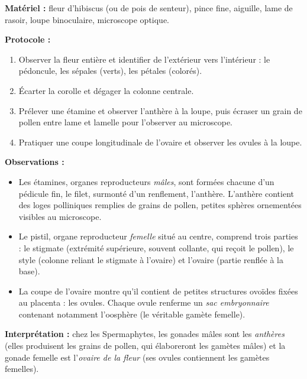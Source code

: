 \documentclass[11pt]{article}
\newcommand{\cle}[1]{{\popxbold\color{popdark}#1}}
\begin{document}
\begin{experience}
\textbf{Matériel :} fleur d'hibiscus (ou de pois de senteur), pince fine, aiguille, lame de rasoir, loupe binoculaire, microscope optique.

\textbf{Protocole :}
\begin{enumerate}
\item Observer la fleur entière et identifier de l'extérieur vers l'intérieur : le pédoncule, les sépales (verts), les pétales (colorés).
\item Écarter la corolle et dégager la colonne centrale.
\item Prélever une étamine et observer l'anthère à la loupe, puis écraser un grain de pollen entre lame et lamelle pour l'observer au microscope.
\item Pratiquer une coupe longitudinale de l'ovaire et observer les ovules à la loupe.
\end{enumerate}

\textbf{Observations :}
\begin{itemize}
\item Les \cle{étamines}, organes reproducteurs \emph{mâles}, sont formées chacune d'un pédicule fin, le \cle{filet}, surmonté d'un renflement, l'\cle{anthère}. L'anthère contient des loges polliniques remplies de \cle{grains de pollen}, petites sphères ornementées visibles au microscope.
\item Le \cle{pistil}, organe reproducteur \emph{femelle} situé au centre, comprend trois parties : le \cle{stigmate} (extrémité supérieure, souvent collante, qui reçoit le pollen), le \cle{style} (colonne reliant le stigmate à l'ovaire) et l'\cle{ovaire} (partie renflée à la base).
\item La coupe de l'ovaire montre qu'il contient de petites structures ovoïdes fixées au placenta : les \cle{ovules}. Chaque ovule renferme un \emph{sac embryonnaire} contenant notamment l'\cle{oosphère} (le véritable gamète femelle).
\end{itemize}

\textbf{Interprétation :} chez les Spermaphytes, les gonades mâles sont les \emph{anthères} (elles produisent les grains de pollen, qui élaboreront les gamètes mâles) et la gonade femelle est l'\emph{ovaire de la fleur} (ses ovules contiennent les gamètes femelles).
\end{experience}
\end{document}
